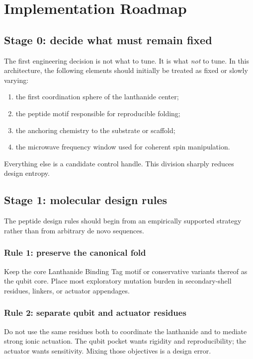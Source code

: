 \documentclass[11pt]{report}
\newcommand{\lbt}{Lanthanide Binding Tag}
\theoremstyle{definition}
\begin{document}
\chapter{Implementation Roadmap}

\section{Stage 0: decide what must remain fixed}
The first engineering decision is not what to tune. It is what \emph{not} to tune. In this architecture, the following elements should initially be treated as fixed or slowly varying:

\begin{enumerate}[leftmargin=2em]
\item the first coordination sphere of the lanthanide center;
\item the peptide motif responsible for reproducible folding;
\item the anchoring chemistry to the substrate or scaffold;
\item the microwave frequency window used for coherent spin manipulation.
\end{enumerate}

Everything else is a candidate control handle. This division sharply reduces design entropy.

\section{Stage 1: molecular design rules}
The peptide design rules should begin from an empirically supported strategy rather than from arbitrary de novo sequences.

\subsection{Rule 1: preserve the canonical fold}
Keep the core \lbt{} motif or conservative variants thereof as the qubit core. Place most exploratory mutation burden in secondary-shell residues, linkers, or actuator appendages.

\subsection{Rule 2: separate qubit and actuator residues}
Do not use the same residues both to coordinate the lanthanide and to mediate strong ionic actuation. The qubit pocket wants rigidity and reproducibility; the actuator wants sensitivity. Mixing those objectives is a design error.
\end{document}
